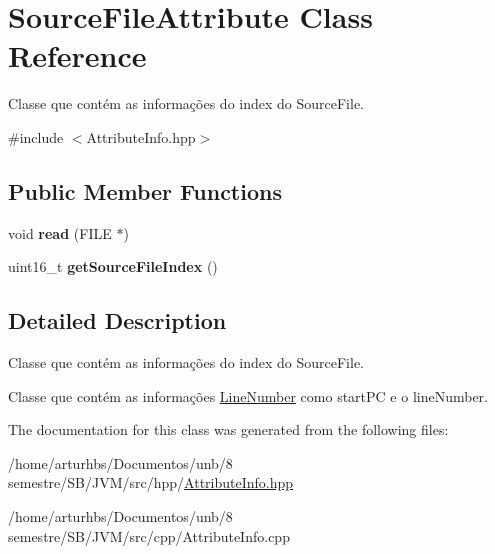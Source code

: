 \hypertarget{classSourceFileAttribute}{}\section{Source\+File\+Attribute Class Reference}
\label{classSourceFileAttribute}


Classe que contém as informações do index do Source\+File.  




{\ttfamily \#include $<$Attribute\+Info.\+hpp$>$}

\subsection*{Public Member Functions}
\begin{DoxyCompactItemize}
\item 
void {\bfseries read} (F\+I\+LE $\ast$)\hypertarget{classSourceFileAttribute_a011f9b30a98b40fefa1055dcdff01c12}{}\label{classSourceFileAttribute_a011f9b30a98b40fefa1055dcdff01c12}

\item 
uint16\+\_\+t {\bfseries get\+Source\+File\+Index} ()\hypertarget{classSourceFileAttribute_ab313b007ed8afe72c8f2ac0d6ff4cc0b}{}\label{classSourceFileAttribute_ab313b007ed8afe72c8f2ac0d6ff4cc0b}

\end{DoxyCompactItemize}


\subsection{Detailed Description}
Classe que contém as informações do index do Source\+File. 

Classe que contém as informações \hyperlink{classLineNumber}{Line\+Number} como start\+PC e o line\+Number. 

The documentation for this class was generated from the following files\+:\begin{DoxyCompactItemize}
\item 
/home/arturhbs/\+Documentos/unb/8 semestre/\+S\+B/\+J\+V\+M/src/hpp/\hyperlink{AttributeInfo_8hpp}{Attribute\+Info.\+hpp}\item 
/home/arturhbs/\+Documentos/unb/8 semestre/\+S\+B/\+J\+V\+M/src/cpp/Attribute\+Info.\+cpp\end{DoxyCompactItemize}
